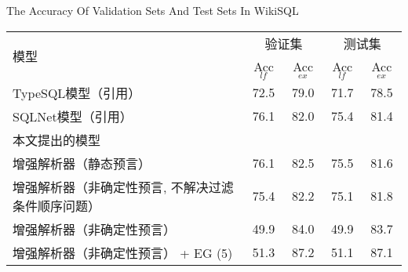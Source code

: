 \begin{table}[!htpb]
    {The Accuracy Of Validation Sets And Test Sets In WikiSQL}
  \label{tab:wzyzjhcsjdzqd}
  \centering
  \begin{threeparttable}[b]
     \begin{tabular}{lcccc}
      \toprule
      \multirow{2}{10mm}{模型}&\multicolumn{2}{c}{验证集} & \multicolumn{2}{c}{测试集}\\
      \cmidrule(lr){2-3}\cmidrule(lr){4-5}
      & Acc$_{lf}$ & Acc$_{ex}$ & Acc$_{lf}$ & Acc$_{ex}$\\
      \midrule
      TypeSQL模型（引用） & 72.5 & 79.0 & 71.7 & 78.5\\
      SQLNet模型（引用） & 76.1 & 82.0 & 75.4 & 81.4\\
      \midrule 
      本文提出的模型 &  &  &  & \\
      增强解析器（静态预言） & 76.1 & 82.5 & 75.5 & 81.6\\
      增强解析器（非确定性预言, 不解决过滤条件顺序问题） & 75.4 & 82.2 & 75.1 & 81.8\\
      增强解析器（非确定性预言） & 49.9 & 84.0 & 49.9 & 83.7\\
      增强解析器（非确定性预言） + EG (5) & 51.3 & 87.2 & 51.1 & 87.1\\
      \bottomrule
    \end{tabular}
  \end{threeparttable}
\end{table}

